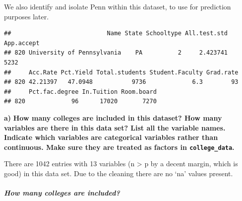 \documentclass[]{article}
\newenvironment{Shaded}{\begin{snugshade}}{\end{snugshade}}
\newcommand{\KeywordTok}[1]{\textcolor[rgb]{0.13,0.29,0.53}{\textbf{#1}}}
\newcommand{\StringTok}[1]{\textcolor[rgb]{0.31,0.60,0.02}{#1}}
\newcommand{\CommentTok}[1]{\textcolor[rgb]{0.56,0.35,0.01}{\textit{#1}}}
\newcommand{\OperatorTok}[1]{\textcolor[rgb]{0.81,0.36,0.00}{\textbf{#1}}}
\newcommand{\NormalTok}[1]{#1}
\let\oldsubparagraph\subparagraph
\renewcommand{\subparagraph}[1]{\oldsubparagraph{#1}\mbox{}}
\begin{document}
We also identify and isolate Penn within this dataset, to use for
prediction purposes later.

\begin{Shaded}
\end{Shaded}

\begin{verbatim}
##                           Name State Schooltype All.test.std App.accept
## 820 University of Pennsylvania    PA          2     2.423741       5232
##     Acc.Rate Pct.Yield Total.students Student.Faculty Grad.rate
## 820 42.21397   47.0948           9736             6.3        93
##     Pct.fac.degree In.Tuition Room.board
## 820             96      17020       7270
\end{verbatim}

\textbf{a)} \textbf{How many colleges are included in this dataset? How
many variables are there in this data set? List all the variable names.
Indicate which variables are categorical variables rather than
continuous. Make sure they are treated as factors in
\texttt{college\_data}.}

There are 1042 entries with 13 variables (n \textgreater{} p by a decent
margin, which is good) in this data set. Due to the cleaning there are
no `na' values present.

\subparagraph{How many colleges are
included?}\label{how-many-colleges-are-included}

\begin{Shaded}
\end{Shaded}
\end{document}
